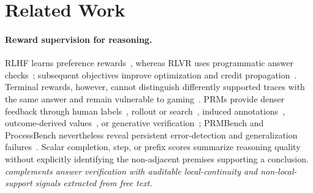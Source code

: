 
\section{Related Work}
\label{sec:related_work}

\paragraph{Reward supervision for reasoning.}
RLHF learns preference rewards~\citep{ouyang2022training}, whereas RLVR uses programmatic answer checks~\citep{shao2024deepseekmath,deepseekr1,lambert2024tulu3,zeng2025simplerlzoo}; subsequent objectives improve optimization and credit propagation~\citep{yu2025dapo,kazemnejad2025vineppo}. Terminal rewards, however, cannot distinguish differently supported traces with the same answer and remain vulnerable to gaming~\citep{gao2023scaling,skalse2022defining,gao2024designing}. PRMs provide denser feedback through human labels~\citep{uesato2022solving,lightman2023lets}, rollout or search~\citep{wang2024math,luo2024omegaprm,zhang2024rest}, induced annotations~\citep{lu2024autopsv}, outcome-derived values~\citep{yuan2024implicitprm,cui2026prime}, or generative verification~\citep{thinkprm2025,genprm2026}; PRMBench and ProcessBench nevertheless reveal persistent error-detection and generalization failures~\citep{song2025prmbench,zheng2024processbench}. Scalar completion, step, or prefix scores summarize reasoning quality without explicitly identifying the non-adjacent premises supporting a conclusion. \textit{\method complements answer verification with auditable local-continuity and non-local-support signals extracted from free text.}

